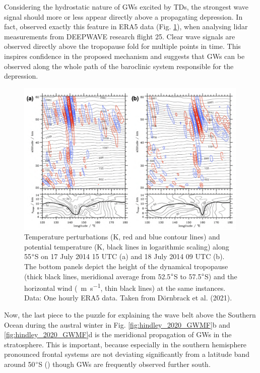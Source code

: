 Considering the hydrostatic nature of GWs excited by TDs, the strongest wave signal should more or less appear directly above a propagating depression. In fact, \textcite{dornbrack_stratospheric_2022} observed exactly this feature in ERA5 data (Fig. \ref{fig:RF25_waves}), when analysing lidar measurements from DEEPWAVE research flight 25. Clear wave signals are observed directly above the tropopause fold for multiple points in time. This inspires confidence in the proposed mechanism and suggests that GWs can be observed along the whole path of the baroclinic system responsible for the depression.
%
\begin{figure}[ht]
    \centering
    \includegraphics[width=0.99\textwidth]{Figures/RF25_waves.png}
    \caption{Temperature perturbations (K, red and blue contour lines) and potential temperature (K, black lines in logarithmic scaling) along 55$\degree$S on 17 July 2014 15 UTC (a) and 18 July 2014 09 UTC (b). The bottom panels depict the height of the dynamical tropopause (thick black lines, meridional average from 52.5$\degree$S to 57.5$\degree$S) and the horizontal wind (\SI{}{\meter\second^{-1}}, thin black lines) at the same instances. Data: One hourly ERA5 data. Taken from Dörnbrack et al. (2021).}
    \label{fig:RF25_waves}
\end{figure}
%
Now, the last piece to the puzzle for explaining the wave belt above the Southern Ocean during the austral winter in Fig. \ref{fig:hindley_2020_GWMF}b and \ref{fig:hindley_2020_GWMF}d is the meridional propagation of GWs in the stratosphere. This is important, because especially in the southern hemisphere pronounced frontal systems are not deviating significantly from a latitude band around 50$\degree$S (\cite{skerlak_tropopause_2015}) though GWs are frequently observed further south.

